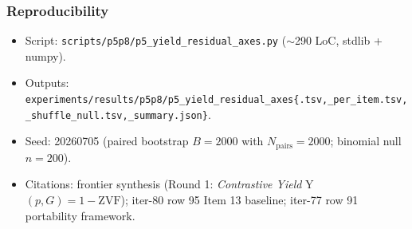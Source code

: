 \subsubsection*{Reproducibility}
\begin{itemize}
  \item Script: \texttt{scripts/p5p8/p5\_yield\_residual\_axes.py} ($\sim$290 LoC, stdlib + numpy).
  \item Outputs: \texttt{experiments/results/p5p8/p5\_yield\_residual\_axes\{.tsv,\_per\_item.tsv,\_shuffle\_null.tsv,\_summary.json\}}.
  \item Seed: 20260705 (paired bootstrap $B=2000$ with $N_{\mathrm{pairs}}=2000$; binomial null $n=200$).
  \item Citations: frontier synthesis (Round 1: \emph{Contrastive Yield} Y$(p,G)=1-\mathrm{ZVF}$); iter-80 row 95 Item 13 baseline; iter-77 row 91 portability framework.
\end{itemize}
